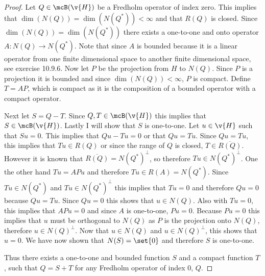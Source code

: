 \documentclass[11pt, oneside]{article}
\begin{document}
\begin{enumerate}
    \begin{proof}
      Let $Q \in \mcB(\v{H})$ be a Fredholm operator of index zero.
      This implies that $\dim(N(Q)) = \dim(N(Q^*)) < \infty$ and that $R(Q)$
      is closed.
      Since $\dim(N(Q)) = \dim(N(Q^*))$ there exists a one-to-one and onto
      operator $A:N(Q) \to N(Q^*)$.
      Note that since $A$ is bounded because it is a linear operator from one
      finite dimensional space to another finite dimensional space, see
      exercise 10.9.6.
      Now let $P$ be the projection from $H$ to $N(Q)$.
      Since $P$ is a projection it is bounded and since $\dim(N(Q)) < \infty$,
      $P$ is compact.
      Define $T = AP$, which is compact as it is the composition of a bounded
      operator with a compact operator.

      Next let $S = Q - T$.
      Since $Q, T \in \mcB(\v{H})$ this implies that $S \in \mcB(\v{H})$.
      Lastly I will show that $S$ is one-to-one.
      Let $u \in \v{H}$ such that $Su = 0$.
      This implies that $Qu - Tu = 0$ or that $Qu = Tu$.
      Since $Qu = Tu$, this implies that $Tu \in R(Q)$ or since the
      range of $Q$ is closed, $T \in \overline{R(Q)}$.
      However it is known that $\overline{R(Q)} = N(Q^*)^{\perp}$, so therefore
      $Tu \in N(Q^*)^{\perp}$.
      One the other hand $Tu = APu$ and therefore $Tu \in R(A) = N(Q^*)$.
      Since $Tu \in N(Q^*)$ and $Tu \in N(Q^*)^{\perp}$ this implies that
      $Tu = 0$ and therefore $Qu = 0$ because $Qu = Tu$.
      Since $Qu = 0$ this shows that $u \in N(Q)$.
      Also with $Tu = 0$, this implies that $APu = 0$ and since $A$ is
      one-to-one, $Pu = 0$.
      Because $Pu = 0$ this implies that $u$ must be orthogonal to $N(Q)$ as
      $P$ is the projection onto $N(Q)$, therefore $u \in N(Q)^{\perp}$.
      Now that $u \in N(Q)$ and $u \in N(Q)^{\perp}$, this shows that $u = 0$.
      We have now shown that $N(S) = \set{0}$ and therefore $S$ is one-to-one.

      Thus there exists a one-to-one and bounded function $S$ and a compact
      function $T$, such that $Q = S + T$ for any Fredholm operator of index 0,
      $Q$.
    \end{proof}

\end{enumerate}
\end{document}
